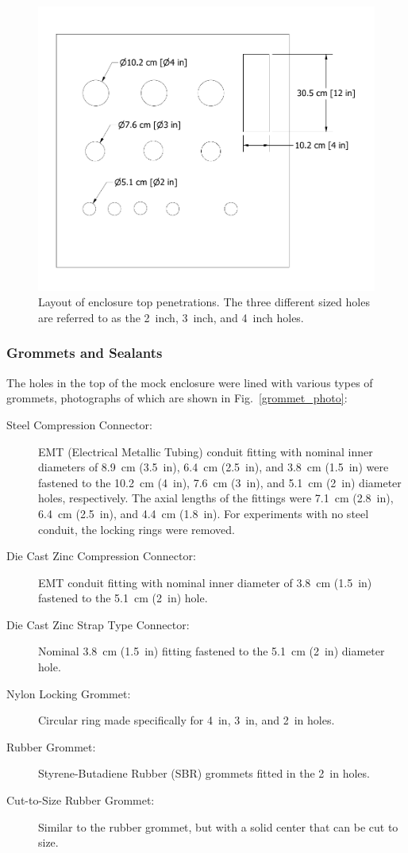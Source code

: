 \begin{figure}[p]
\includegraphics[width=\textwidth]{../FIGURES/Cabinet_Top_Assembly_No_Dims}
\caption[Layout of enclosure top penetrations]{Layout of enclosure top penetrations. The three different sized holes are referred to as the 2~inch, 3~inch, and 4~inch holes.}
\label{mock_cabinet_penetrations}
\end{figure}

\FloatBarrier

\subsubsection{Grommets and Sealants}

The holes in the top of the mock enclosure were lined with various types of grommets, photographs of which are shown in Fig.~\ref{grommet_photo}:
\begin{description}
\item[Steel Compression Connector:] EMT (Electrical Metallic Tubing) conduit fitting with nominal inner diameters of 8.9~cm (3.5~in), 6.4~cm (2.5~in), and 3.8~cm (1.5~in) were fastened to the 10.2~cm (4~in), 7.6~cm (3~in), and 5.1~cm (2~in) diameter holes, respectively. The axial lengths of the fittings were 7.1~cm (2.8~in), 6.4~cm (2.5~in), and 4.4~cm (1.8~in). For experiments with no steel conduit, the locking rings were removed.
\item[Die Cast Zinc Compression Connector:] EMT conduit fitting with nominal inner diameter of 3.8~cm (1.5~in) fastened to the 5.1~cm (2~in) hole.
\item[Die Cast Zinc Strap Type Connector:] Nominal 3.8~cm (1.5~in) fitting fastened to the 5.1~cm (2~in) diameter hole.
\item[Nylon Locking Grommet:] Circular ring made specifically for 4~in, 3~in, and 2~in holes.
\item[Rubber Grommet:] Styrene-Butadiene Rubber (SBR) grommets fitted in the 2~in holes.
\item[Cut-to-Size Rubber Grommet:] Similar to the rubber grommet, but with a solid center that can be cut to size.
\end{description}

